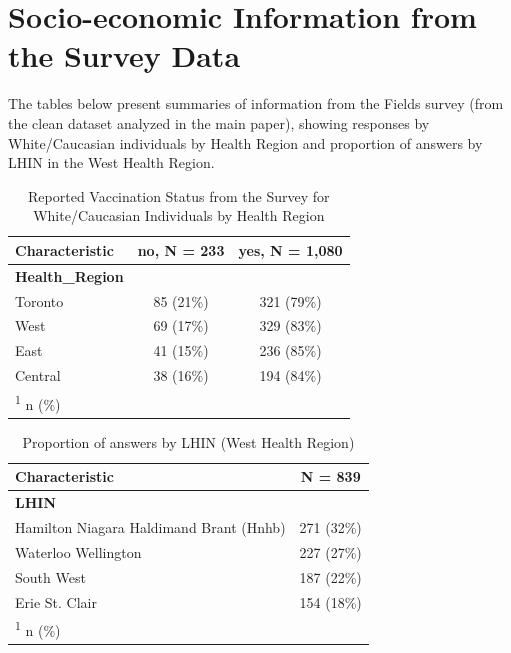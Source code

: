 \documentclass[
  letterpaper,
  DIV=11,
  numbers=noendperiod]{scrartcl}
\begin{document}
\hypertarget{socio-economic-information-from-the-survey-data}{%
\section{Socio-economic Information from the Survey
Data}\label{socio-economic-information-from-the-survey-data}}

The tables below present summaries of information from the Fields survey
(from the clean dataset analyzed in the main paper), showing responses
by White/Caucasian individuals by Health Region and proportion of
answers by LHIN in the West Health Region.

\hypertarget{tbl-hr-percentages}{}
\begin{table}
\caption{\label{tbl-hr-percentages}Reported Vaccination Status from the Survey for White/Caucasian
Individuals by Health Region }\tabularnewline

\centering
\begin{tabular}{lcc}
\toprule
\textbf{Characteristic} & \textbf{no}, N = 233 & \textbf{yes}, N = 1,080\\
\midrule
\textbf{Health\_Region} &  & \\
\hspace{1em}Toronto & 85 (21\%) & 321 (79\%)\\
\hspace{1em}West & 69 (17\%) & 329 (83\%)\\
\hspace{1em}East & 41 (15\%) & 236 (85\%)\\
\hspace{1em}Central & 38 (16\%) & 194 (84\%)\\
\bottomrule
\multicolumn{3}{l}{\rule{0pt}{1em}\textsuperscript{1} n (\%)}\\
\end{tabular}
\end{table}

\hypertarget{tbl-west-hr-lhin}{}
\begin{table}
\caption{\label{tbl-west-hr-lhin}Proportion of answers by LHIN (West Health Region) }\tabularnewline

\centering
\begin{tabular}{lc}
\toprule
\textbf{Characteristic} & \textbf{N = 839}\\
\midrule
\textbf{LHIN} & \\
\hspace{1em}Hamilton Niagara Haldimand Brant (Hnhb) & 271 (32\%)\\
\hspace{1em}Waterloo Wellington & 227 (27\%)\\
\hspace{1em}South West & 187 (22\%)\\
\hspace{1em}Erie St. Clair & 154 (18\%)\\
\bottomrule
\multicolumn{2}{l}{\rule{0pt}{1em}\textsuperscript{1} n (\%)}\\
\end{tabular}
\end{table}
\end{document}
